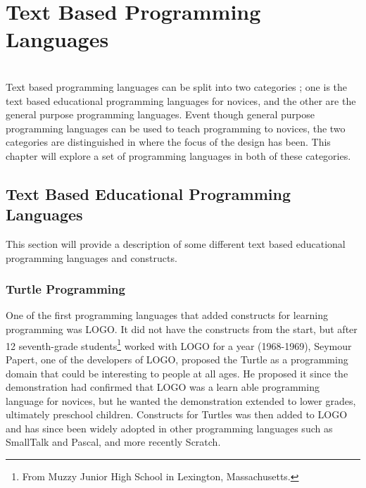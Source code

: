 \section{Text Based Programming Languages}
\label{sec:text_based_programming_languages}
\\
Text based programming languages can be split into two categories ; one is the text based educational programming languages for novices, and the other are the general purpose programming languages. Event though general purpose programming languages can be used to teach programming to novices, the two categories are distinguished in where the focus of the design has been. This chapter will explore a set of programming languages in both of these categories.

\subsection{Text Based Educational Programming Languages}
This section will provide a description of some different text based educational programming languages and constructs.
\subsubsection{Turtle Programming}
One of the first programming languages that added constructs for learning programming was LOGO. It did not have the constructs from the start, but after 12 seventh-grade students\footnote{From Muzzy Junior High School in Lexington, Massachusetts.} worked with LOGO for a year (1968-1969), Seymour Papert, one of the developers of LOGO, proposed the Turtle as a programming domain that could be interesting to people at all ages. He proposed it since the demonstration had confirmed that LOGO was a learn able  programming language for novices, but he wanted the demonstration extended to lower grades, ultimately preschool children. Constructs for Turtles was then added to LOGO and has since been widely adopted in other programming languages such as SmallTalk and Pascal, and more recently Scratch\cite{turtle_origin}.

